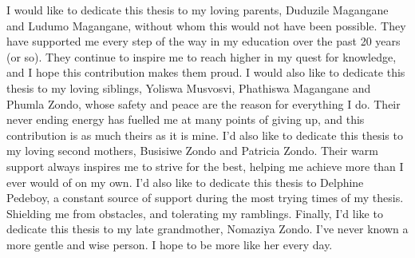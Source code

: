 
\begin{dedication} 

I would like to dedicate this thesis to my loving parents, Duduzile Magangane and Ludumo Magangane, without whom this would not have been possible. They have supported me every step of the way in my education over the past 20 years (or so). They continue to inspire me to reach higher in my quest for knowledge, and I hope this contribution makes them proud. \newline
I would also like to dedicate this thesis to my loving siblings, Yoliswa Musvosvi, Phathiswa Magangane and Phumla Zondo, whose safety and peace are the reason for everything I do. Their never ending energy has fuelled me at many points of giving up, and this contribution is as much theirs as it is mine. I'd also like to dedicate this thesis to my loving second mothers, Busisiwe Zondo and Patricia Zondo. Their warm support always inspires me to strive for the best, helping me achieve more than I ever would of on my own. \newline 
I'd also like to dedicate this thesis to Delphine Pedeboy, a constant source of support during the most trying times of my thesis. Shielding me from obstacles, and tolerating my ramblings. \newline
Finally, I'd like to dedicate this thesis to my late grandmother, Nomaziya Zondo. I've never known a more gentle and wise person. I hope to be more like her every day. \newline
 
\end{dedication}